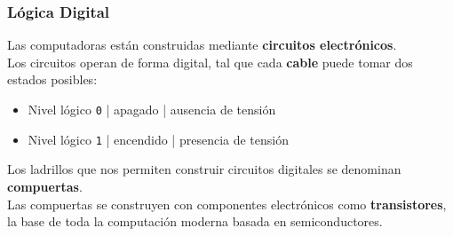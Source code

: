 \documentclass[aspectratio=169]{beamer}
\begin{document}
\begin{frame}[fragile]
    \frametitle{Lógica Digital}
    Las computadoras están construidas mediante \textbf{circuitos electrónicos}.\\
    \bigskip
    Los circuitos operan de forma digital, tal que cada \textbf{cable} puede tomar dos estados posibles:
    \begin{itemize}
     \item \textcolor{naranjauca}{Nivel lógico \texttt{0}} | \textcolor{verdeuca}{apagado} | \textcolor{verdeuca}{ausencia de tensión}
     \item \textcolor{naranjauca}{Nivel lógico \texttt{1}} | \textcolor{verdeuca}{encendido} | \textcolor{verdeuca}{presencia de tensión}
    \end{itemize}
    \bigskip
    Los ladrillos que nos permiten construir circuitos digitales se denominan \textbf{compuertas}.\\
    \bigskip
    Las compuertas se construyen con componentes electrónicos como \textbf{transistores},\\
    la base de toda la computación moderna basada en semiconductores.
\end{frame}
\end{document}
